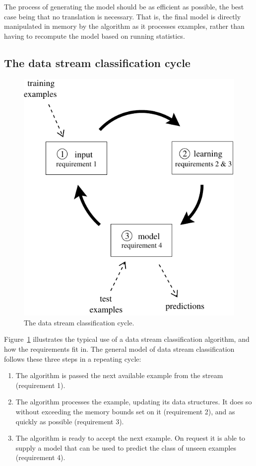 The process of generating the model should be as efficient as possible, the best case being that no translation is necessary. That is, the final model is directly manipulated in memory by the algorithm as it processes examples, rather than having to recompute the model based on running statistics. 

\subsection*{The data stream classification cycle}

\begin{figure}
\centering
\includegraphics{figures/ds_cycle}
\caption{The data stream classification cycle.}
\label{fig:ds_cycle}
\end{figure}

Figure~\ref{fig:ds_cycle} illustrates the typical use of a data stream classification algorithm, and how the requirements fit in. The general model of data stream classification follows these three steps in a repeating cycle:

\begin{enumerate}

\item The algorithm is passed the next available example from the stream (requirement 1).

\item The algorithm processes the example, updating its data structures. It does so without exceeding the memory bounds set on it (requirement 2), and as quickly as possible (requirement 3).

\item The algorithm is ready to accept the next example. On request it is able to supply a model that can be used to predict the class of unseen examples (requirement 4).

\end{enumerate}

